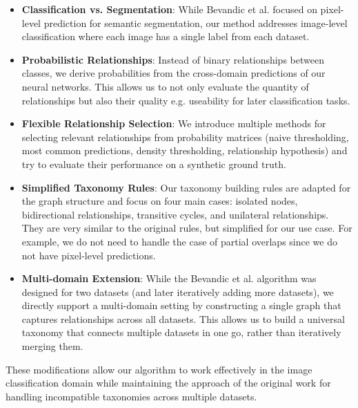 \begin{itemize}
      \item \textbf{Classification vs. Segmentation}: While Bevandic et al. focused on pixel-level prediction for semantic segmentation,
            our method addresses image-level classification where each image has a single label from each dataset.

      \item \textbf{Probabilistic Relationships}: Instead of binary relationships between classes,
            we derive probabilities from the cross-domain predictions of our neural networks.
            This allows us to not only evaluate the quantity of relationships but also their quality
            e.g. useability for later classification tasks.

      \item \textbf{Flexible Relationship Selection}: We introduce multiple methods for selecting relevant relationships from probability matrices (naive thresholding, most common predictions, density thresholding, relationship hypothesis)
            and try to evaluate their performance on a synthetic ground truth.

      \item \textbf{Simplified Taxonomy Rules}: Our taxonomy building rules are adapted for the graph structure and focus on four main cases: isolated nodes, bidirectional relationships, transitive cycles, and unilateral relationships.
            They are very similar to the original rules, but simplified for our use case.
            For example, we do not need to handle the case of partial overlaps since we do not have pixel-level predictions.

      \item \textbf{Multi-domain Extension}: While the Bevandic et al. algorithm was designed for two datasets
            (and later iteratively adding more datasets),
            we directly support a multi-domain setting by constructing a single graph
            that captures relationships across all datasets.
            This allows us to build a universal taxonomy that connects multiple datasets in one go,
            rather than iteratively merging them.
\end{itemize}

These modifications allow our algorithm to work effectively in the image classification domain
while maintaining the approach of the original work for handling incompatible taxonomies across multiple datasets.

